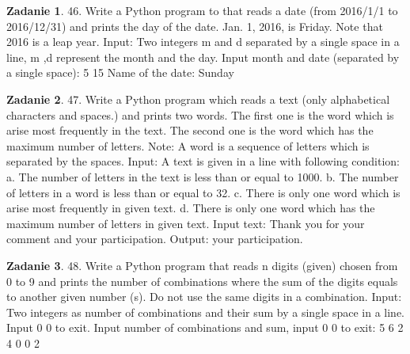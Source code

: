 \documentclass[11pt]{article}
\theoremstyle{definition}
\newtheorem{zadanie}{Zadanie}
\begin{document}
\begin{zadanie}
46. Write a Python program to that reads a date (from 2016/1/1 to 2016/12/31) and prints the day of the date. Jan. 1, 2016, is Friday. Note that 2016 is a leap year.
Input:
Two integers m and d separated by a single space in a line, m ,d represent the month and the day.
Input month and date (separated by a single space):
5 15
Name of the date: Sunday
\end{zadanie}

\begin{zadanie}
47. Write a Python program which reads a text (only alphabetical characters and spaces.) and prints two words. The first one is the word which is arise most frequently in the text. The second one is the word which has the maximum number of letters.
Note: A word is a sequence of letters which is separated by the spaces.
Input:
A text is given in a line with following condition:
a. The number of letters in the text is less than or equal to 1000.
b. The number of letters in a word is less than or equal to 32.
c. There is only one word which is arise most frequently in given text.
d. There is only one word which has the maximum number of letters in given text.
Input text: Thank you for your comment and your participation.
Output: your participation.
\end{zadanie}

\begin{zadanie}
48. Write a Python program that reads n digits (given) chosen from 0 to 9 and prints the number of combinations where the sum of the digits equals to another given number (s). Do not use the same digits in a combination.
Input:
Two integers as number of combinations and their sum by a single space in a line. Input 0 0 to exit.
Input number of combinations and sum, input 0 0 to exit:
5 6
2 4
0 0
2
\end{zadanie}
\end{document}
